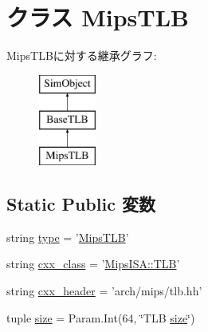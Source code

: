 \hypertarget{classMipsTLB_1_1MipsTLB}{
\section{クラス MipsTLB}
\label{classMipsTLB_1_1MipsTLB}
}
MipsTLBに対する継承グラフ:\begin{figure}[H]
\begin{center}
\leavevmode
\includegraphics[height=3cm]{classMipsTLB_1_1MipsTLB}
\end{center}
\end{figure}
\subsection*{Static Public 変数}
\begin{DoxyCompactItemize}
\item 
string \hyperlink{classMipsTLB_1_1MipsTLB_acce15679d830831b0bbe8ebc2a60b2ca}{type} = '\hyperlink{classMipsTLB_1_1MipsTLB}{MipsTLB}'
\item 
string \hyperlink{classMipsTLB_1_1MipsTLB_a58cd55cd4023648e138237cfc0822ae3}{cxx\_\-class} = '\hyperlink{classMipsISA_1_1TLB}{MipsISA::TLB}'
\item 
string \hyperlink{classMipsTLB_1_1MipsTLB_a17da7064bc5c518791f0c891eff05fda}{cxx\_\-header} = 'arch/mips/tlb.hh'
\item 
tuple \hyperlink{classMipsTLB_1_1MipsTLB_a377e5da8df1f89c5468c8b8cd07eac89}{size} = Param.Int(64, \char`\"{}TLB \hyperlink{classMipsTLB_1_1MipsTLB_a377e5da8df1f89c5468c8b8cd07eac89}{size}\char`\"{})
\end{DoxyCompactItemize}



